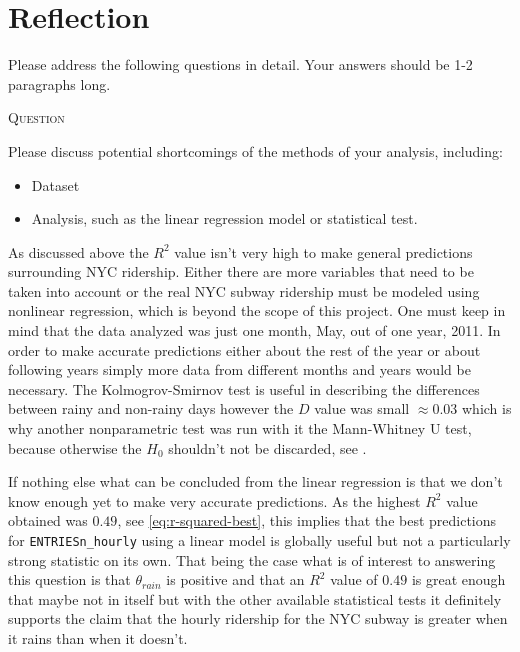 \documentclass{article}
\newcounter{questionCtr}
\newenvironment{question}{%
   \bigskip\noindent%
   \refstepcounter{questionCtr}%
   \textsc{Question \thequestionCtr}%
   \newline%
   }{\par\bigskip}  %
\numberwithin{questionCtr}{section}
\numberwithin{problemCtr}{section}
\begin{document}
\section{Reflection}
\label{sec:reflection}
Please address the following questions in detail. Your answers should be 1-2
paragraphs long.

\begin{question}
Please discuss potential shortcomings of the methods of your analysis,
including:  
\begin{itemize}
  \item Dataset
  \item Analysis, such as the linear regression model or statistical test.
\end{itemize}
\end{question}
As discussed above the $R^2$ value isn't very high to make general predictions
surrounding NYC ridership.  Either there are more variables that need to be
taken into account or the real NYC subway ridership must be modeled using
nonlinear regression, which is beyond the scope of this project.  One must keep
in mind that the data analyzed was just one month, May, out of one year, 2011.
In order to make accurate predictions either about the rest of the year or about
following years simply more data from different months and years would be
necessary.  The Kolmogrov-Smirnov test is useful in describing the differences
between rainy and non-rainy days however the $D$ value was small $\approx 0.03$
which is why another nonparametric test was run with it the Mann-Whitney U test,
because otherwise the $H_0$ shouldn't not be discarded, see
\cite{Understanding-Kolmogorov-Smirnov}.
 
If nothing else what can be concluded from the linear regression is that we
don't know enough yet to make very accurate predictions.  As the highest
$R^2$ value obtained was $0.49$, see \autoref{eq:r-squared-best}, this implies
that the best predictions for \verb|ENTRIESn_hourly| using a linear model is
globally useful but not a particularly strong statistic on its own.  That being
the case what is of interest to answering this question is that
$\theta_{rain}$ is positive and that an $R^2$ value of $0.49$ is great enough
that maybe not in itself but with the other available statistical tests it
definitely supports the claim that the hourly ridership for the NYC subway is
greater when it rains than when it doesn't.
\end{document}
